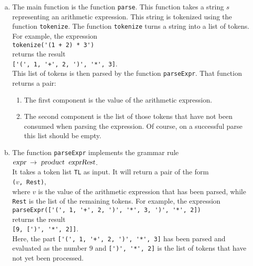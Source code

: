 \begin{enumerate}[(a)]
\item The main function is the function \texttt{parse}. This function takes a string $s$
      representing an arithmetic expression.  This string is tokenized using the 
      function \texttt{tokenize}.  The function \texttt{tokenize} turns a
      string into a list of tokens.  For example, the expression
      \\[0.2cm]
      \hspace*{1.3cm}
      \verb|tokenize('(1 + 2) * 3')|
      \\[0.2cm]
      returns the result
      \\[0.2cm]
      \hspace*{1.3cm}
      \verb|['(', 1, '+', 2, ')', '*', 3]|.
      \\[0.2cm]
      This list of tokens is then parsed by the function \texttt{parseExpr}.
      That function returns a pair: 
      \begin{enumerate}
      \item The first  component is the value of the arithmetic expression.
      \item The second component is the list of those tokens that have not been consumed
            when parsing the expression.  Of course, on a successful parse this list
            should be empty.
      \end{enumerate}
\item The function \texttt{parseExpr} implements the grammar rule
      \\[0.2cm]
      \hspace*{1.3cm}
      $\textsl{expr} \;\rightarrow\;\textsl{product}\;\;\textsl{exprRest}$. 
      \\[0.2cm]
      It takes a token list \texttt{TL} as input.  It will return a pair of the form
      \\[0.2cm]
      \hspace*{1.3cm}
      \texttt{($v$, Rest)},
      \\[0.2cm]
      where $v$ is the value of the arithmetic expression that has been parsed, while
      \texttt{Rest} is the list of the remaining tokens.  For example, the expression
      \\[0.2cm]
      \hspace*{1.3cm}
      \verb|parseExpr(['(', 1, '+', 2, ')', '*', 3, ')', '*', 2])|
      \\[0.2cm]
      returns the result
      \\[0.2cm]
      \hspace*{1.3cm}
      \verb|[9, [')', '*', 2]]|.
      \\[0.2cm]
      Here, the part \verb|['(', 1, '+', 2, ')', '*', 3]| has been parsed and evaluated as
      the number $9$ and \verb|[')', '*', 2]| is the list of tokens that have not yet been
      processed.


\end{enumerate}
